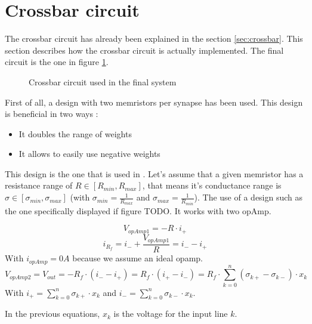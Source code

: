 \section{Crossbar circuit}
\label{sec:xbarCircuit}

The crossbar circuit has already been explained in the section \ref{sec:crossbar}. This section describes how the crossbar circuit is actually implemented. The final circuit is the one in figure \ref{fig:xbarCircuit}.

\begin{figure}[H]
  \centering
  
  \caption{Crossbar circuit used in the final system}
  \label{fig:xbarCircuit}
\end{figure}

First of all, a design with two memristors per synapse has been used. This design is beneficial in two ways :

\begin{itemize}
  \item It doubles the range of weights
  \item It allows to easily use negative weights
\end{itemize}

This design is the one that is used in \cite{doubleMem}. Let's assume that a given memristor has a resistance range of $R\in[R_{min},R_{max}]$, that means it's conductance range is $\sigma \in [\sigma_{min},\sigma_{max}]$ (with $\sigma_{min}= \frac{1}{R_{max}}$ and $\sigma_{max}= \frac{1}{R_{min}}$). The use of a design such as the one specifically displayed if figure TODO. It works with two \ac{opAmp}.

\begin{equation}
  V_{opAmp1}=-R\cdot i_+
\end{equation}
\begin{equation}
  i_{R_f}=i_-+\frac{V_{opAmp1}}{R}=i_--i_+
\end{equation}
With $i_{opAmp}=0A$ because we assume an ideal \ac{opamp}.
\begin{equation}
  V_{opAmp2}=V_{out}=-R_f\cdot(i_--i_+)=R_f\cdot(i_+-i_-)=R_f\cdot\sum_{k=0}^n(\sigma_{k+}-\sigma_{k-})\cdot x_k
\end{equation}
With $i_+=\sum_{k=0}^n\sigma_{k+}\cdot x_k$ and $i_-=\sum_{k=0}^n\sigma_{k-}\cdot x_k$.

In the previous equations, $x_k$ is the voltage for the input line $k$.


